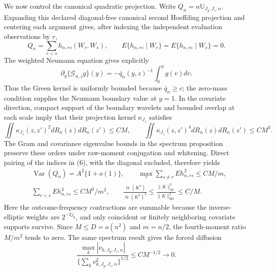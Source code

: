 We now control the canonical quadratic projection.  Write \(Q_n=n\mathbb U_{J_y,J_z,n}\).  Expanding this declared diagonal-free canonical second Hoeffding projection and centering each argument gives, after indexing the independent evaluation observations by \(r\),
\[
Q_n=\sum_{r<s}h_{n,rs}(W_r,W_s),
\qquad
E\{h_{n,rs}\mid W_r\}=E\{h_{n,rs}\mid W_s\}=0.                    \tag{6}
\]
The weighted Neumann equation gives explicitly
\[
\partial_y\{\mathcal G_{n,z}g\}(y)
=-\bar q_n(y,z)^{-1}\int_0^y g(v)dv.
\]
Thus the Green kernel is uniformly bounded because \(\bar q_n\ge c\); the zero-mass condition supplies the Neumann boundary value at \(y=1\).  In the covariate direction, compact support of the boundary wavelets and bounded overlap at each scale imply that their projection kernel \(\kappa_{J_z}\) satisfies
\[
\iint\kappa_{J_z}(z,z')^2dR_n(z)dR_n(z')\le CM,
\qquad
\iint\kappa_{J_z}(z,z')^4dR_n(z)dR_n(z')\le CM^3.
\]
The Gram and covariance eigenvalue bounds in the spectrum proposition preserve these orders under raw-moment conjugation and whitening.  Direct pairing of the indices in (6), with the diagonal excluded, therefore yields
\[
\begin{aligned}
&\operatorname{Var}(Q_n)=A^2\{1+o(1)\},
\qquad \max_r\sum_{s\ne r}E h_{n,rs}^2\le CM/m,\\
&\sum_{r<s}E h_{n,rs}^4\le CM^3/m^2,
\qquad
\frac{\operatorname{tr}(K^4)}{\operatorname{tr}(K^2)^2}
\le\frac{\|K\|_{\mathrm{op}}^2}{\|K\|_{\mathrm{HS}}^2}\le C/M.
\end{aligned}                                                           \tag{7}
\]
Here the outcome-frequency contractions are summable because the inverse-elliptic weights are \(2^{-2j_y}\), and only coincident or finitely neighboring covariate supports survive.  Since \(M\le D=o(n^2)\) and \(m=n/2\), the fourth-moment ratio \(M/m^2\) tends to zero.  The same spectrum result gives the forced diffusion
\[
\frac{\max_k|\nu_{k,J_y,J_z,n}|}{\{\sum_k\nu_{k,J_y,J_z,n}^2\}^{1/2}}
\le CM^{-1/2}\longrightarrow0.                                        \tag{8}
\]

